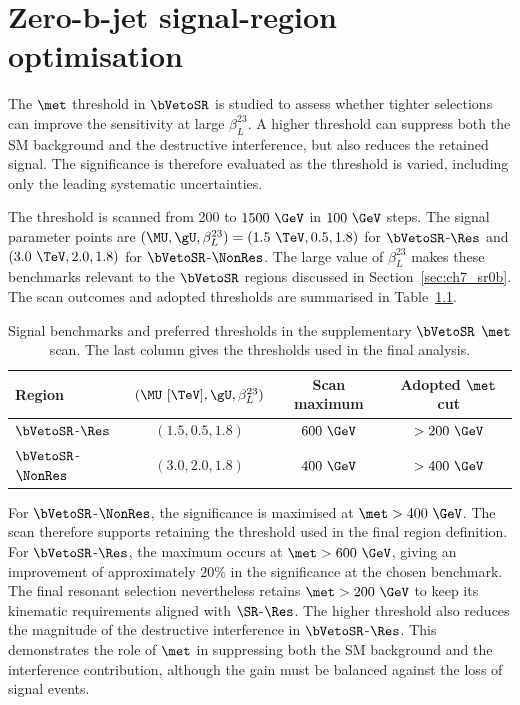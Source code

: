 \chapter{Zero-b-jet signal-region optimisation}
\label{app:sr0b_optimisation}

The $\met$ threshold in $\bVetoSR$ is studied to assess whether tighter selections can improve the sensitivity at large $\beta_L^{23}$.
A higher threshold can suppress both the SM background and the destructive interference, but also reduces the retained signal.
The significance is therefore evaluated as the threshold is varied, including only the leading systematic uncertainties.

The threshold is scanned from 200 to $1500~\GeV$ in $100~\GeV$ steps.
The signal parameter points are $(\MU,\gU,\beta_L^{23})=(1.5~\TeV,0.5,1.8)$ for $\bVetoSR$-$\Res$ and $(3.0~\TeV,2.0,1.8)$ for $\bVetoSR$-$\NonRes$.
The large value of $\beta_L^{23}$ makes these benchmarks relevant to the $\bVetoSR$ regions discussed in Section~\ref{sec:ch7_sr0b}.
The scan outcomes and adopted thresholds are summarised in Table~\ref{tab:app_sr0b_scan}.

\begin{table}[htbp]
    \centering
    \small
    \caption{Signal benchmarks and preferred thresholds in the supplementary $\bVetoSR$ $\met$ scan. The last column gives the thresholds used in the final analysis.}
    \label{tab:app_sr0b_scan}
    \begin{tabular}{lccc}
        \toprule
        Region & $(\MU~[\TeV],\gU,\beta_L^{23})$ & Scan maximum & Adopted $\met$ cut \\
        \midrule
        $\bVetoSR$-$\Res$ & $(1.5,0.5,1.8)$ & $600~\GeV$ & $>200~\GeV$ \\
        $\bVetoSR$-$\NonRes$ & $(3.0,2.0,1.8)$ & $400~\GeV$ & $>400~\GeV$ \\
        \bottomrule
    \end{tabular}
\end{table}

For $\bVetoSR$-$\NonRes$, the significance is maximised at $\met>400~\GeV$.
The scan therefore supports retaining the threshold used in the final region definition.
For $\bVetoSR$-$\Res$, the maximum occurs at $\met>600~\GeV$, giving an improvement of approximately $20\%$ in the significance at the chosen benchmark.
The final resonant selection nevertheless retains $\met>200~\GeV$ to keep its kinematic requirements aligned with $\SR$-$\Res$.
The higher threshold also reduces the magnitude of the destructive interference in $\bVetoSR$-$\Res$.
This demonstrates the role of $\met$ in suppressing both the SM background and the interference contribution, although the gain must be balanced against the loss of signal events.
